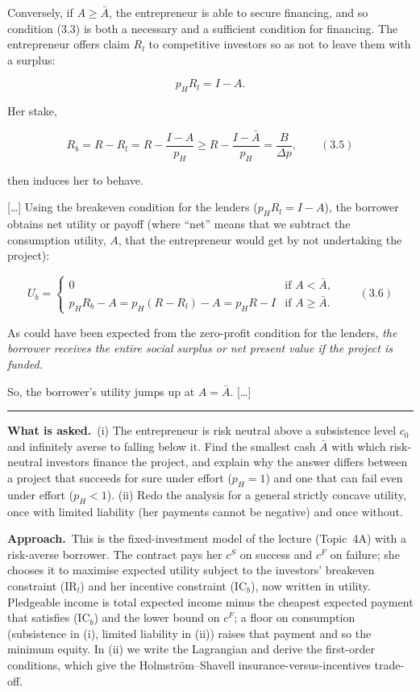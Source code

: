 \documentclass[11pt,a4paper]{article}
\newcommand{\asked}{\par\medskip\noindent\textbf{What is asked.}~}
\newcommand{\approach}{\par\smallskip\noindent\textbf{Approach.}~}
\newcommand{\stmtend}{\par\endgroup\nopagebreak\noindent\rule{\linewidth}{0.4pt}\par\medskip}
\begin{document}
Conversely, if \(A \geqslant \bar A\), the entrepreneur is able to secure financing, and so
condition (3.3) is both a necessary and a sufficient condition for financing. The entrepreneur
offers claim \(R_l\) to competitive investors so as not to leave them with a surplus:

\[p_H R_l = I - A.\]

Her stake,

\[R_b = R - R_l = R - \frac{I - A}{p_H} \geqslant R - \frac{I - \bar A}{p_H} = \frac{B}{\Delta p}, \qquad (3.5)\]

then induces her to behave.

{[}\ldots{]} Using the breakeven condition for the lenders (\(p_H R_l = I - A\)), the borrower
obtains net utility or payoff (where ``net'' means that we subtract the consumption utility, \(A\),
that the entrepreneur would get by not undertaking the project):

\[U_b = \begin{cases} 0 & \text{if } A < \bar A, \\ p_H R_b - A = p_H(R - R_l) - A = p_H R - I & \text{if } A \geqslant \bar A. \end{cases} \qquad (3.6)\]

As could have been expected from the zero-profit condition for the lenders, \emph{the borrower
receives the entire social surplus or net present value if the project is funded.}

So, the borrower's utility jumps up at \(A = \bar A\). {[}\ldots{]}
\stmtend

\asked (i) The entrepreneur is risk neutral above a subsistence level $c_0$ and infinitely averse
to falling below it. Find the smallest cash $\bar A$ with which risk-neutral investors finance the
project, and explain why the answer differs between a project that succeeds for sure under effort
($p_H=1$) and one that can fail even under effort ($p_H<1$). (ii) Redo the analysis for a general
strictly concave utility, once with limited liability (her payments cannot be negative) and once
without.

\approach This is the fixed-investment model of the lecture (Topic~4A) with a risk-averse
borrower. The contract pays her $c^S$ on success and $c^F$ on failure; she chooses it to maximise
expected utility subject to the investors' breakeven constraint (IR$_l$) and her incentive
constraint (IC$_b$), now written in utility. Pledgeable income is total expected income minus the
cheapest expected payment that satisfies (IC$_b$) and the lower bound on $c^F$; a floor on
consumption (subsistence in (i), limited liability in (ii)) raises that payment and so the minimum
equity. In (ii) we write the Lagrangian and derive the first-order conditions, which give the
Holmstr\"om--Shavell insurance-versus-incentives trade-off.
\end{document}
